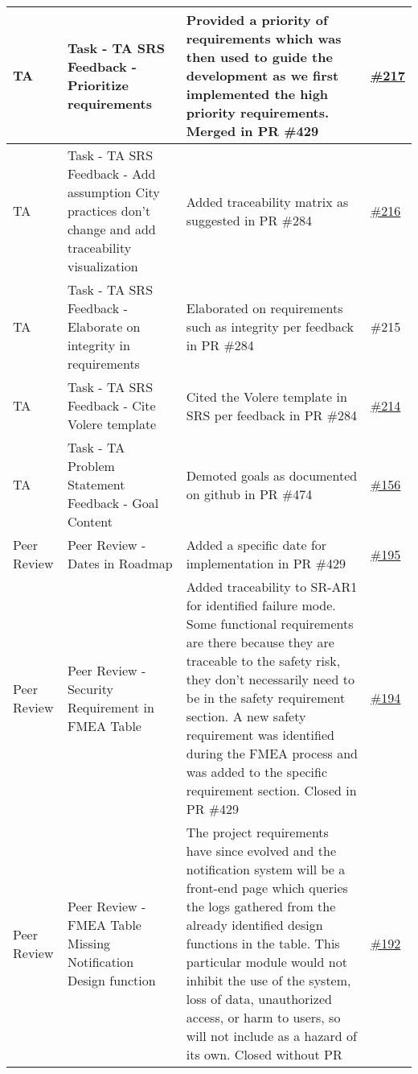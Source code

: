 \documentclass{article}
\begin{document}
\begin{longtable}{|m{3cm}|m{3cm}|m{5cm}|m{1cm}|}
  \hline
  TA & Task - TA SRS Feedback - Prioritize requirements & Provided a priority of requirements which was then used to guide the
  development as we first implemented the high priority requirements. Merged in PR \#429 & \href{https://github.com/Spitgranger/SyncMaster/pull/217}{\#217}\\
  \hline
  TA & Task - TA SRS Feedback - Add assumption City practices don't change and add traceability visualization &
  Added traceability matrix as suggested in PR \#284 & \href{https://github.com/Spitgranger/SyncMaster/pull/216}{\#216}\\
  \hline
  TA & Task - TA SRS Feedback - Elaborate on integrity in requirements & Elaborated on requirements such as integrity per 
  feedback in PR \#284 & \#215\\
  \hline
  TA & Task - TA SRS Feedback - Cite Volere template & Cited the Volere template in SRS per feedback in PR \#284 & \href{https://github.com/Spitgranger/SyncMaster/pull/214}{\#214}\\
  \hline
  TA & Task - TA Problem Statement Feedback - Goal Content & Demoted goals as documented on github in PR \#474 & \href{https://github.com/Spitgranger/SyncMaster/pull/156}{\#156}\\
  \hline
  Peer Review & Peer Review - Dates in Roadmap & Added a specific date for implementation in PR \#429 & \href{https://github.com/Spitgranger/SyncMaster/pull/195}{\#195} \\
 \hline
 Peer Review & Peer Review - Security Requirement in FMEA Table & Added traceability to SR-AR1 for identified failure mode.
 Some functional requirements are there because they are traceable to the safety risk, 
 they don't necessarily need to be in the safety requirement section.
  A new safety requirement was identified during the FMEA process and was added to the specific requirement section.
  Closed in PR \#429 & \href{https://github.com/Spitgranger/SyncMaster/pull/194}{\#194}\\
\hline
Peer Review & Peer Review - FMEA Table Missing Notification Design function & The project requirements have
 since evolved and the notification system
 will be a front-end page which queries the logs gathered from the already identified design functions in the table.
This particular module would not inhibit the use of the system,
 loss of data, unauthorized access, or harm to users, so will not include as a hazard of its own. Closed without PR & \href{https://github.com/Spitgranger/SyncMaster/pull/192}{\#192} \\

\end{longtable}
\end{document}
